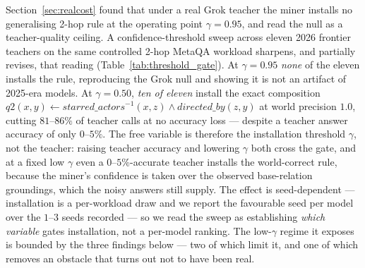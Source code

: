 \documentclass[11pt]{article}
\theoremstyle{plain}
\begin{document}
Section~\ref{sec:realcost} found that under a real Grok teacher the miner installs
no generalising 2-hop rule at the operating point $\gamma{=}0.95$, and read the
null as a teacher-quality ceiling. A confidence-threshold sweep across eleven
2026 frontier teachers on the same controlled 2-hop MetaQA workload sharpens, and
partially revises, that reading (Table~\ref{tab:threshold_gate}). At
$\gamma{=}0.95$ \emph{none} of the eleven installs the rule, reproducing the Grok
null and showing it is not an artifact of 2025-era models. At $\gamma{=}0.50$,
\emph{ten of eleven} install the exact composition
$q2(x,y)\!\leftarrow\!\mathit{starred\_actors}^{-1}(x,z)\wedge\mathit{directed\_by}(z,y)$
at world precision $1.0$, cutting $81$--$86\%$ of teacher calls at no accuracy
loss --- despite a teacher answer accuracy of only $0$--$5\%$. The free variable
is therefore the installation threshold $\gamma$, not the teacher: raising teacher
accuracy and lowering $\gamma$ both cross the gate, and at a fixed low $\gamma$
even a $0$--$5\%$-accurate teacher installs the world-correct rule, because the
miner's confidence is taken over the observed base-relation groundings, which the
noisy answers still supply. The effect is seed-dependent --- installation is a
per-workload draw and we report the favourable seed per model over the $1$--$3$
seeds recorded --- so we read the sweep as establishing \emph{which variable}
gates installation, not a per-model ranking. The low-$\gamma$ regime it exposes
is bounded by the three findings below --- two of which limit it, and one of
which removes an obstacle that turns out not to have been real.
\end{document}
